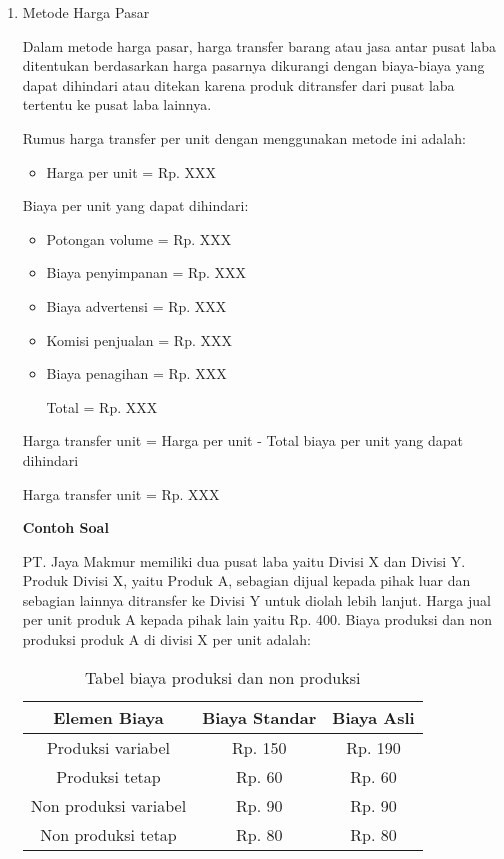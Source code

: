 \begin{enumerate}
	\item Metode Harga Pasar
	
	Dalam metode harga pasar, harga transfer barang atau jasa antar pusat laba ditentukan berdasarkan harga pasarnya dikurangi dengan biaya-biaya yang dapat dihindari atau ditekan karena produk ditransfer dari pusat laba tertentu ke pusat laba lainnya.

	Rumus harga transfer per unit dengan menggunakan metode ini adalah:

	\begin{itemize}
		\item Harga per unit = Rp. XXX
	\end{itemize}

	Biaya per unit yang dapat dihindari:

	\begin{itemize}
		\item Potongan volume = Rp. XXX
		\item Biaya penyimpanan = Rp. XXX
		\item Biaya advertensi = Rp. XXX
		\item Komisi penjualan = Rp. XXX
		\item Biaya penagihan = Rp. XXX
		 
		Total = Rp. XXX
	\end{itemize}

	Harga transfer unit = Harga per unit - Total biaya per unit yang dapat dihindari

	Harga transfer unit = Rp. XXX

	\textbf{Contoh Soal}

	PT. Jaya Makmur memiliki dua pusat laba yaitu Divisi X dan Divisi Y. Produk Divisi X, yaitu Produk A, sebagian dijual kepada pihak luar dan sebagian lainnya ditransfer ke Divisi Y untuk diolah lebih lanjut. Harga jual per unit produk A kepada pihak lain yaitu Rp. 400. Biaya produksi dan non produksi produk A di divisi X per unit adalah:

	\begin{table}[H]	
		\begin{center}
			\caption{Tabel biaya produksi dan non produksi}
			\label{tab:table3}
			\begin{tabular}{c|c|c} %
			\textbf{Elemen Biaya} & \textbf{Biaya Standar} & \textbf{Biaya Asli} \\
			\hline
			Produksi variabel & Rp. 150 & Rp. 190 \\
			Produksi tetap & Rp. 60 & Rp. 60 \\
			Non produksi variabel &  Rp. 90 & Rp. 90 \\
			Non produksi tetap & Rp. 80 & Rp. 80 \\
			\end{tabular}
		\end{center}
	\end{table}


\end{enumerate}
